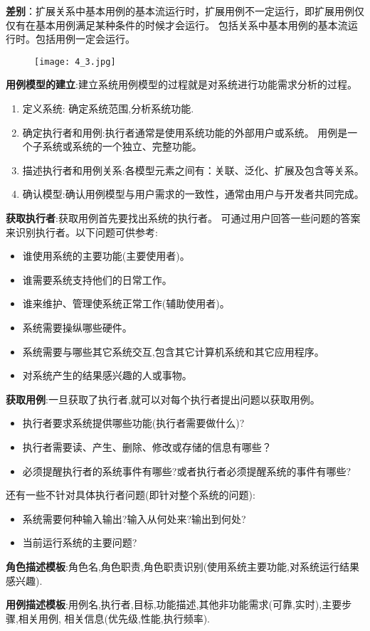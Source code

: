 \documentclass[../main.tex]{subfiles}
\begin{document}
\textbf{差别}：扩展关系中基本用例的基本流运行时，扩展用例不一定运行，即扩展用例仅仅有在基本用例满足某种条件的时候才会运行。
包括关系中基本用例的基本流运行时。包括用例一定会运行。
\begin{figure}[H]
  \begin{center}
    \texttt{[image: 4\_3.jpg]}
  \end{center}
\end{figure}
\textbf{用例模型的建立}:建立系统用例模型的过程就是对系统进行功能需求分析的过程。
\begin{enumerate}
  \item 定义系统: 确定系统范围,分析系统功能.
  \item 确定执行者和用例:执行者通常是使用系统功能的外部用户或系统。
    用例是一个子系统或系统的一个独立、完整功能。
  \item 描述执行者和用例关系:各模型元素之间有：关联、泛化、扩展及包含等关系。
  \item 确认模型:确认用例模型与用户需求的一致性，通常由用户与开发者共同完成。
\end{enumerate}
\textbf{获取执行者}:获取用例首先要找出系统的执行者。
可通过用户回答一些问题的答案来识别执行者。以下问题可供参考:
\begin{itemize}
  \item 谁使用系统的主要功能(主要使用者)。
  \item 谁需要系统支持他们的日常工作。
  \item 谁来维护、管理使系统正常工作(辅助使用者)。
  \item 系统需要操纵哪些硬件。
  \item 系统需要与哪些其它系统交互,包含其它计算机系统和其它应用程序。
  \item 对系统产生的结果感兴趣的人或事物。
\end{itemize}
\textbf{获取用例}:一旦获取了执行者,就可以对每个执行者提出问题以获取用例。
\begin{itemize}
  \item 执行者要求系统提供哪些功能(执行者需要做什么)?
  \item 执行者需要读、产生、删除、修改或存储的信息有哪些？
  \item 必须提醒执行者的系统事件有哪些?或者执行者必须提醒系统的事件有哪些?
\end{itemize}
还有一些不针对具体执行者问题(即针对整个系统的问题):
\begin{itemize}
  \item 系统需要何种输入输出?输入从何处来?输出到何处?
  \item 当前运行系统的主要问题?
\end{itemize}
\textbf{角色描述模板}:角色名,角色职责,角色职责识别(使用系统主要功能,对系统运行结果感兴趣).

\textbf{用例描述模板}:用例名,执行者,目标,功能描述,其他非功能需求(可靠,实时),主要步骤,相关用例,
相关信息(优先级,性能,执行频率).
\end{document}

